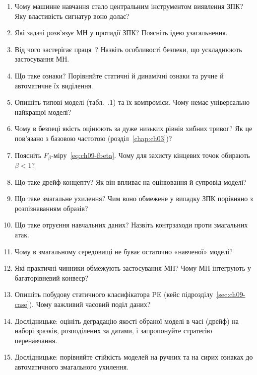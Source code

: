 \selfcheck
\begin{enumerate}
\item Чому машинне навчання стало центральним інструментом виявлення ЗПК? Яку властивість сигнатур воно долає?
\item Які задачі розв'язує МН у протидії ЗПК? Поясніть ідею узагальнення.
\item Від чого застерігає праця~\cite{ch09:sommer}? Назвіть особливості безпеки, що ускладнюють застосування МН.
\item Що таке ознаки? Порівняйте статичні й динамічні ознаки та ручне й автоматичне їх виділення.
\item Опишіть типові моделі (табл.~\thechapter.1) та їх компроміси. Чому немає універсально найкращої моделі?
\item Чому в безпеці якість оцінюють за дуже низьких рівнів хибних тривог? Як це пов'язано з базовою частотою (розділ~\ref{chap:ch03})?
\item Поясніть $F_\beta$-міру~\eqref{eq:ch09-fbeta}. Чому для захисту кінцевих точок обирають $\beta<1$?
\item Що таке дрейф концепту? Як він впливає на оцінювання й супровід моделі?
\item Що таке змагальне ухилення? Чим воно обмежене у випадку ЗПК порівняно з розпізнаванням образів?
\item Що таке отруєння навчальних даних? Назвіть контрзаходи проти змагальних атак.
\item Чому в змагальному середовищі не буває остаточно «навченої» моделі?
\item Які практичні чинники обмежують застосування МН? Чому МН інтегрують у багаторівневий конвеєр?
\item Опишіть побудову статичного класифікатора PE (кейс підрозділу~\ref{sec:ch09-case}). Чому важливий часовий поділ даних?
\item Дослідницьке: оцініть деградацію якості обраної моделі в часі (дрейф) на наборі зразків, розподілених за датами, і запропонуйте стратегію перенавчання.
\item Дослідницьке: порівняйте стійкість моделей на ручних та на сирих ознаках до автоматичного змагального ухилення.
\end{enumerate}
